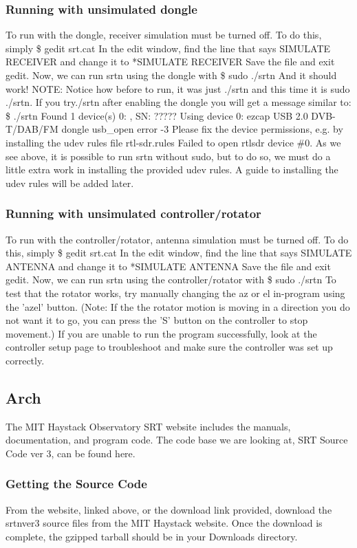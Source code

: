\documentclass[11pt]{article} %
\begin{document}
\subsubsection{Running with unsimulated dongle}
To run with the dongle, receiver simulation must be turned off. To do this, simply
\$ gedit srt.cat
In the edit window, find the line that says
SIMULATE RECEIVER
and change it to
*SIMULATE RECEIVER
Save the file and exit gedit. Now, we can run srtn using the dongle with
\$ sudo ./srtn
And it should work!
NOTE: Notice how before to run, it was just ./srtn and this time it is sudo ./srtn. If you try./srtn after enabling the dongle you will get a message similar to:
\$ ./srtn
Found 1 device(s)
  0:  ,   SN:  ?????
Using device 0: ezcap USB 2.0 DVB-T/DAB/FM dongle
usb\_open error -3
Please fix the device permissions, e.g. by installing the udev rules file rtl-sdr.rules
Failed to open rtlsdr device \#0.
As we see above, it is possible to run srtn without sudo, but to do so, we must do a little extra work in installing the provided udev rules. A guide to installing the udev rules will be added later.

\subsubsection{Running with unsimulated controller/rotator}
To run with the controller/rotator, antenna simulation must be turned off. To do this, simply
\$ gedit srt.cat
In the edit window, find the line that says
SIMULATE ANTENNA
and change it to
*SIMULATE ANTENNA
Save the file and exit gedit. Now, we can run srtn using the controller/rotator with
\$ sudo ./srtn
To test that the rotator works, try manually changing the az or el in-program using the 'azel' button. (Note: If the the rotator motion is moving in a direction you do not want it to go, you can press the 'S' button on the controller to stop movement.)
If you are unable to run the program successfully, look at the controller setup page to troubleshoot and make sure the controller was set up correctly.

\subsection{Arch}

The MIT Haystack Observatory SRT website includes the manuals, documentation, and program code. The code base we are looking at, SRT Source Code ver 3, can be found here.

\subsubsection{Getting the Source Code}
From the website, linked above, or the download link provided, download the srtnver3 source files from the MIT Haystack website. Once the download is complete, the gzipped tarball should be in your Downloads directory.
\end{document}
